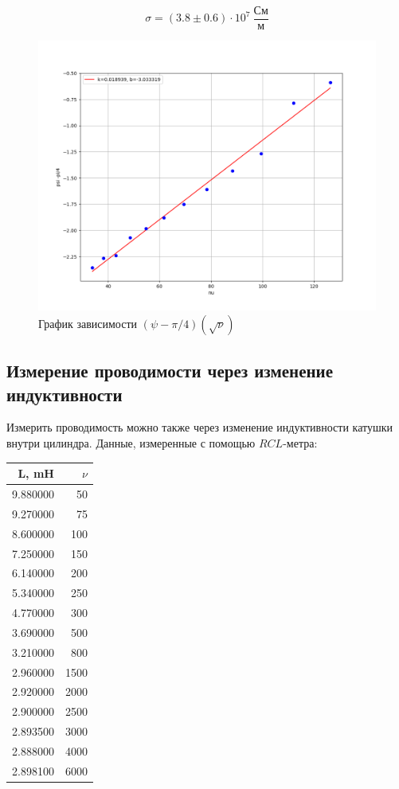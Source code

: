 \documentclass[a4paper, 12pt]{article}
\begin{document}
	\begin{equation}
		\sigma = (3.8 \pm 0.6) \cdot 10^7 \ \frac{\text{См}}{\text{м}}
	\end{equation}
	
	\begin{figure}[h]
		\centering
		\includegraphics[width=\textwidth]{data/data5}
		\caption{График зависимости $(\psi - \pi/4)(\sqrt{\nu})$}
		\newpage
	\end{figure}
	
	\subsection*{Измерение проводимости через изменение индуктивности}
	Измерить проводимость можно также через изменение индуктивности катушки внутри цилиндра. Данные, измеренные с помощью $RCL$-метра:
	
	\begin{table}[h!]
		\centering
		\begin{tabular}{rr}
            \toprule
            L, mH & $\nu$ \\
            \midrule
            9.880000 & 50 \\
            9.270000 & 75 \\
            8.600000 & 100 \\
            7.250000 & 150 \\
            6.140000 & 200 \\
            5.340000 & 250 \\
            4.770000 & 300 \\
            3.690000 & 500 \\
            3.210000 & 800 \\
            2.960000 & 1500 \\
            2.920000 & 2000 \\
            2.900000 & 2500 \\
            2.893500 & 3000 \\
            2.888000 & 4000 \\
            2.898100 & 6000 \\
            \bottomrule
            \end{tabular}
	\end{table}
	
\end{document}
